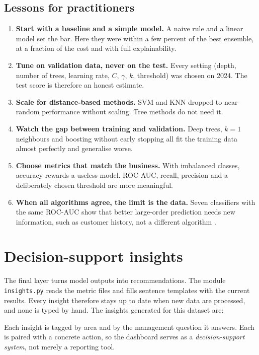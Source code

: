 \subsection{Lessons for practitioners}
\begin{enumerate}
  \item \textbf{Start with a baseline and a simple model.} A naive rule and a linear model set the bar. Here they
        were within a few percent of the best ensemble, at a fraction of the cost and with full explainability.
  \item \textbf{Tune on validation data, never on the test.} Every setting (depth, number of trees, learning
        rate, $C$, $\gamma$, $k$, threshold) was chosen on 2024. The test score is therefore an honest estimate.
  \item \textbf{Scale for distance-based methods.} SVM and KNN dropped to near-random performance without
        scaling. Tree methods do not need it.
  \item \textbf{Watch the gap between training and validation.} Deep trees, $k=1$ neighbours and boosting without
        early stopping all fit the training data almost perfectly and generalise worse.
  \item \textbf{Choose metrics that match the business.} With imbalanced classes, accuracy rewards a useless
        model. ROC-AUC, recall, precision and a deliberately chosen threshold are more meaningful.
  \item \textbf{When all algorithms agree, the limit is the data.} Seven classifiers with the same ROC-AUC show
        that better large-order prediction needs new information, such as customer history, not a different
        algorithm \citep{kelleher2020, geron2022}.
\end{enumerate}
\section{Decision-support insights}\label{sec:insights}
The final layer turns model outputs into recommendations. The module \texttt{insights.py} reads the metric
files and fills sentence templates with the current results. Every insight therefore stays up to date when new
data are processed, and none is typed by hand. The insights generated for this dataset are:



Each insight is tagged by area and by the management question it answers. Each is paired with a concrete
action, so the dashboard serves as a \emph{decision-support system}, not merely a reporting tool.

